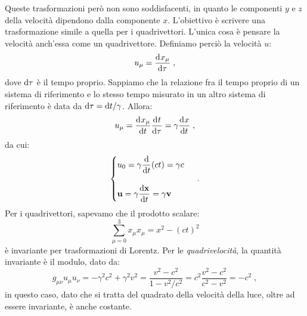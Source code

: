 Queste trasformazioni però non sono soddisfacenti, in quanto le componenti $y$ e $z$ della velocità dipendono dalla componente $x$. 
L'obiettivo è scrivere una trasformazione simile a quella per i quadrivettori. L'unica cosa è pensare la velocità anch'essa come un 
quadrivettore. Definiamo perciò la velocità $u$:
\begin{equation}
u_{\mu}=\frac{\mathrm{d}^{}x_{\mu}}{\mathrm{d}\tau^{}}\;,
\end{equation}
dove $\mathrm{d}{\tau}$ è il tempo proprio. Sappiamo che la relazione fra il tempo proprio di un sistema di riferimento e lo stesso tempo misurato in un altro sistema di riferimento è data da $\mathrm{d}{\tau}=\mathrm{d}{t}/\gamma$. Allora:
\begin{equation}
u_{\mu}=\frac{\mathrm{d}^{}x_{\mu}}{\mathrm{d}t^{}}\frac{\mathrm{d}^{}t}{\mathrm{d}\tau^{}}=\gamma\frac{\mathrm{d}^{}x}{\mathrm{d}t^{}}\;,
\end{equation}
da cui:
\begin{equation}
 \begin{cases}
  u_0=\gamma\dfrac{\mathrm{d}}{\mathrm{d}{t}}(ct)=\gamma c \\
\\
\mathbf{u}=\gamma\dfrac{\mathrm{d}{\mathbf{x}}}{\mathrm{d}{t}}=\gamma\mathbf{v}
 \end{cases}\;.
\end{equation}
Per i quadrivettori, sapevamo che il prodotto scalare:
\begin{equation}
\sum_{\mu=0}^3x_{\mu}x_{\mu}=x^2-(ct)^2
\end{equation}
è invariante per trasformazioni di Lorentz. Per le \textit{quadrivelocità}, la quantità invariante è il modulo, dato da:
\begin{equation}
g_{\mu\nu}u_{\mu}u_{\nu}=-\gamma^2c^2+\gamma^2v^2=\frac{v^2-c^2}{1-v^2/c^2}=c^2\frac{v^2-c^2}{c^2-v^2}=-c^2\;,
\end{equation}
in questo caso, dato che si tratta del quadrato della velocità della luce, oltre ad essere invariante, è anche costante.
